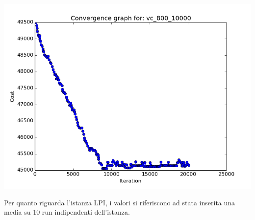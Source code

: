 \documentclass[11pt]{article}
\begin{document}
\begin{center}
\begin{minipage}{0.49\linewidth}
\end{minipage}
\begin{minipage}{0.49\linewidth}
\includegraphics[width=\linewidth]{cg_6.png}
\end{minipage}
\end{center}


\pagebreak

Per quanto riguarda l'istanza LPI, i valori si riferiscono ad stata inserita una media su 10 run indipendenti dell'istanza.
\end{document}
